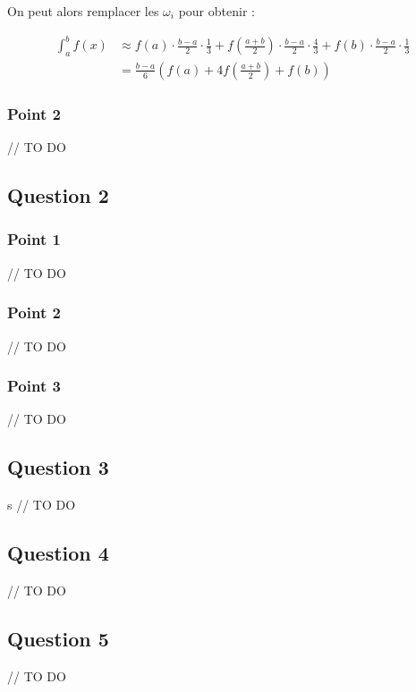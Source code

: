 On peut alors remplacer les $\omega_i$ pour obtenir :

\begin{equation}
	\begin{aligned}
		\int_a^b f(x) &\approx f(a) \cdot \frac{b-a}{2} \cdot \frac{1}{3} + f(\frac{a+b}{2}) \cdot \frac{b-a}{2} \cdot \frac{4}{3} + f(b) \cdot \frac{b-a}{2} \cdot \frac{1}{3} \\
		&= \frac{b-a}{6} \left (f(a) + 4f(\frac{a+b}{2})+f(b) \right )
	\end{aligned}
\end{equation}

\subsubsection{Point 2}

// TO DO

\subsection{Question 2}

\subsubsection{Point 1}

// TO DO

\subsubsection{Point 2}

// TO DO

\subsubsection{Point 3}

// TO DO


\subsection{Question 3}
s
// TO DO


\subsection{Question 4}

// TO DO


\subsection{Question 5}

// TO DO
